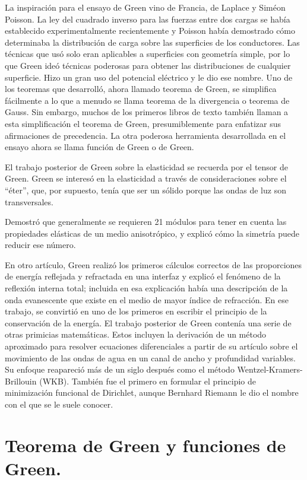La inspiración para el ensayo de Green vino de Francia, de Laplace y Siméon Poisson. La ley del cuadrado inverso para las fuerzas entre dos cargas se había establecido experimentalmente recientemente y Poisson había demostrado cómo determinaba la distribución de carga sobre las superficies de los conductores. Las técnicas que usó solo eran aplicables a superficies con geometría simple, por lo que Green ideó técnicas poderosas para obtener las distribuciones de cualquier superficie. Hizo un gran uso del potencial eléctrico y le dio ese nombre. Uno de los teoremas que desarrolló, ahora llamado teorema de Green, se simplifica fácilmente a lo que a menudo se llama teorema de la divergencia o teorema de Gauss. Sin embargo, muchos de los primeros libros de texto también llaman a esta simplificación el teorema de Green, presumiblemente para enfatizar sus afirmaciones de precedencia. La otra poderosa herramienta desarrollada en el ensayo ahora se llama función de Green o de Green.
\par
El trabajo posterior de Green sobre la elasticidad se recuerda por el tensor de Green. Green se interesó en la elasticidad a través de consideraciones sobre el \enquote{éter}, que, por supuesto, tenía que ser un sólido porque las ondas de luz son transversales.
\par
Demostró que generalmente se requieren 21 módulos para tener en cuenta las propiedades elásticas de un medio anisotrópico, y explicó cómo la simetría puede reducir ese número.
\par
En otro artículo, Green realizó los primeros cálculos correctos de las proporciones de energía reflejada y refractada en una interfaz y explicó el fenómeno de la reflexión interna total; incluida en esa explicación había una descripción de la onda evanescente que existe en el medio de mayor índice de refracción. En ese trabajo, se convirtió en uno de los primeros en escribir el principio de la conservación de la energía. El trabajo posterior de Green contenía una serie de otras primicias matemáticas. Estos incluyen la derivación de un método aproximado para resolver ecuaciones diferenciales a partir de su artículo sobre el movimiento de las ondas de agua en un canal de ancho y profundidad variables. Su enfoque reapareció más de un siglo después como el método Wentzel-Kramers-Brillouin (WKB). También fue el primero en formular el principio de minimización funcional de Dirichlet, aunque Bernhard Riemann le dio el nombre con el que se le suele conocer.

\section{Teorema de Green y funciones de Green.}


